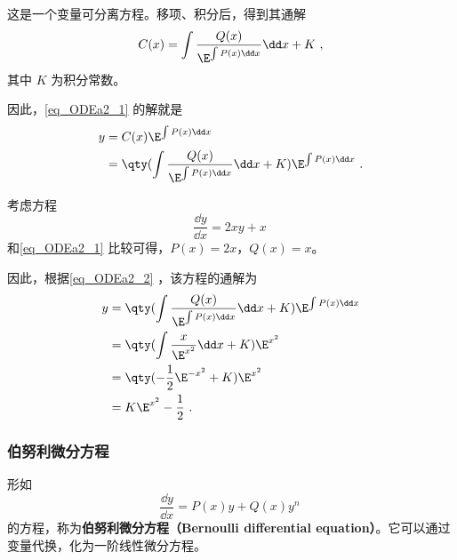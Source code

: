 这是一个变量可分离方程。移项、积分后，得到其通解
\begin{equation}
C(x)=\int\frac{Q(x)}{\E^{\int P(x)\dd x}}\dd x+K~,
\end{equation}
其中 $K$ 为积分常数。

因此，\autoref{eq_ODEa2_1} 的解就是
\begin{equation}\label{eq_ODEa2_2}
\begin{aligned}
y&=C(x)\E^{\int P(x)\dd x}\\
&=\qty(\int\frac{Q(x)}{\E^{\int P(x)\dd x}}\dd x+K)\E^{\int P(x)\dd x}~.
\end{aligned}
\end{equation}

\begin{example}{}
考虑方程
\begin{equation}
\frac{\dd y}{\dd x}=2xy+x~
\end{equation}
和\autoref{eq_ODEa2_1} 比较可得，$P(x)=2x$，$Q(x)=x$。

因此，根据\autoref{eq_ODEa2_2} ，该方程的通解为
\begin{equation}
\begin{aligned}
y&=\qty(\int\frac{Q(x)}{\E^{\int P(x)\dd x}}\dd x+K)\E^{\int P(x)\dd x}\\
&=\qty(\int\frac{x}{\E^{x^2}}\dd x+K)\E^{x^2}\\
&=\qty(-\frac{1}{2}\E^{-x^2}+K)\E^{x^2}\\
&=K\E^{x^2}-\frac{1}{2}~.
\end{aligned}
\end{equation}
\end{example}

\subsubsection{伯努利微分方程}
形如
\begin{equation}
\frac{\dd y}{\dd x}=P(x)y+Q(x)y^n~
\end{equation}
的方程，称为\textbf{伯努利微分方程（Bernoulli differential equation）}。它可以通过变量代换，化为一阶线性微分方程。



















